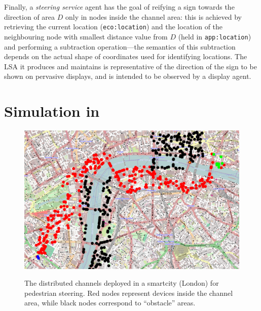 \documentclass[12pt,a4paper,twoside,openright]{book}
\begin{document}
Finally, a \emph{steering service} agent has the goal of reifying a sign towards the direction of area $D$ only in nodes inside the channel area: this is achieved by retrieving the current location (\texttt{eco:location}) and the location  of the neighbouring node with smallest distance value from $D$ (held in \texttt{app:location}) and performing a subtraction operation---the semantics of this subtraction depends on the actual shape of coordinates used for identifying locations.
%
The LSA it produces and maintains is representative of the direction of the sign to be shown on pervasive displays, and is intended to be observed by a display agent.

\section{Simulation in \alchemist{}}

\begin{figure}
\begin{center}{\includegraphics[width=\textwidth]{img/london-channel}}\end{center}
\caption[Channel deployed in London]{The distributed channels deployed in a smartcity (London) for pedestrian steering. Red nodes represent devices inside the channel area, while black nodes correspond to ``obstacle'' areas.}
\label{f:london}
\end{figure}
\end{document}

